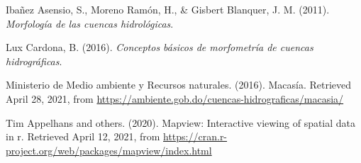 \documentclass[11pt,]{article}
\begin{document}
\hypertarget{ref-ibanez2011morfologia}{}
Ibañez Asensio, S., Moreno Ramón, H., \& Gisbert Blanquer, J. M. (2011).
\emph{Morfología de las cuencas hidrológicas}.

\hypertarget{ref-lux2016conceptos}{}
Lux Cardona, B. (2016). \emph{Conceptos básicos de morfometría de
cuencas hidrográficas}.

\hypertarget{ref-MedioAmbiente}{}
Ministerio de Medio ambiente y Recursos naturales. (2016). Macasía.
Retrieved April 28, 2021, from
\url{https://ambiente.gob.do/cuencas-hidrograficas/macasia/}

\hypertarget{ref-mapview}{}
Tim Appelhans and others. (2020). Mapview: Interactive viewing of
spatial data in r. Retrieved April 12, 2021, from
\url{https://cran.r-project.org/web/packages/mapview/index.html}




\newpage
\singlespacing 
\end{document}
